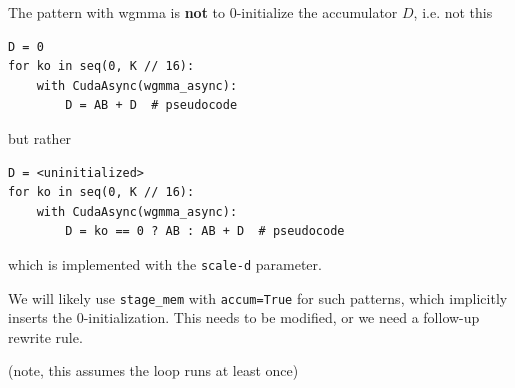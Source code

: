 \begin{minipage}[t]{0.48\textwidth}\fixminipage
{}

The pattern with wgmma is \textbf{not} to 0-initialize the accumulator $D$, i.e. not this
\begin{verbatim}
D = 0
for ko in seq(0, K // 16):
    with CudaAsync(wgmma_async):
        D = AB + D  # pseudocode
\end{verbatim}
but rather
\begin{verbatim}
D = <uninitialized>
for ko in seq(0, K // 16):
    with CudaAsync(wgmma_async):
        D = ko == 0 ? AB : AB + D  # pseudocode
\end{verbatim}
which is implemented with the \texttt{scale-d} parameter.

We will likely use \texttt{stage\_mem} with \texttt{accum=True} for such patterns, which implicitly inserts the 0-initialization.
This needs to be modified, or we need a follow-up rewrite rule.

(note, this assumes the loop runs at least once)
\end{minipage}

